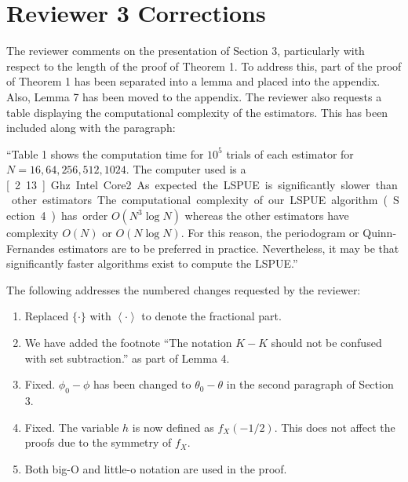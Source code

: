 \documentclass{article}
\begin{document}
\section{Reviewer 3 Corrections}

The reviewer comments on the presentation of Section 3, particularly with respect to the length of the proof of Theorem 1.  To address this, part of the proof of Theorem 1 has been separated into a lemma and placed into the appendix.  Also, Lemma 7 has been moved to the appendix.  The reviewer also requests a table displaying the computational complexity of the estimators.  This has been included along with the paragraph:

``Table 1 shows the computation time for $10^5$ trials of each estimator for $N=16,64,256,512,1024$. The computer used is a \unit[2.13]{Ghz} Intel Core2. As expected the LSPUE is significantly slower than other estimators. The computational complexity of our LSPUE algorithm (Section 4) has order $O(N^3\log{N})$ whereas the other estimators have complexity $O(N)$ or $O(N\log{N})$. For this reason, the periodogram or Quinn-Fernandes estimators are to be preferred in practice. Nevertheless, it may be that significantly faster algorithms exist to compute the LSPUE.''

The following addresses the numbered changes requested by the reviewer:
\begin{enumerate} 
\item Replaced $\{\cdot\}$ with $\left<\cdot\right>$ to denote the fractional part.
\item We have added the footnote ``The notation $K-K$ should not be confused with set subtraction.'' as part of Lemma 4.
\item Fixed.  $\phi_0 - \phi$ has been changed to $\theta_0 - \theta$ in the second paragraph of Section 3.
\item Fixed.  The variable $h$ is now defined as $f_X(-1/2)$.  This does not affect the proofs due to the symmetry of $f_X$.
\item Both big-O and little-o notation are used in the proof.
\end{enumerate}
\end{document}

